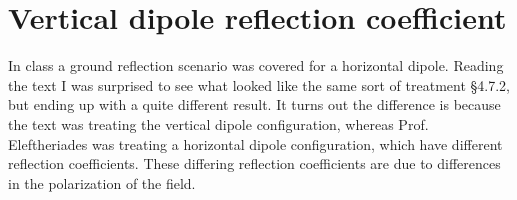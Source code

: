 %
%
\section{Vertical dipole reflection coefficient}
%
In class a ground reflection scenario was covered for a horizontal dipole.  Reading the text I was surprised to see what looked like the same sort of treatment \S 4.7.2, but ending up with a quite different result.  It turns out the difference is because the text was treating the vertical dipole configuration, whereas Prof. Eleftheriades was treating a horizontal dipole configuration, which have different reflection coefficients.  These differing reflection coefficients are due to differences in the polarization of the field.

